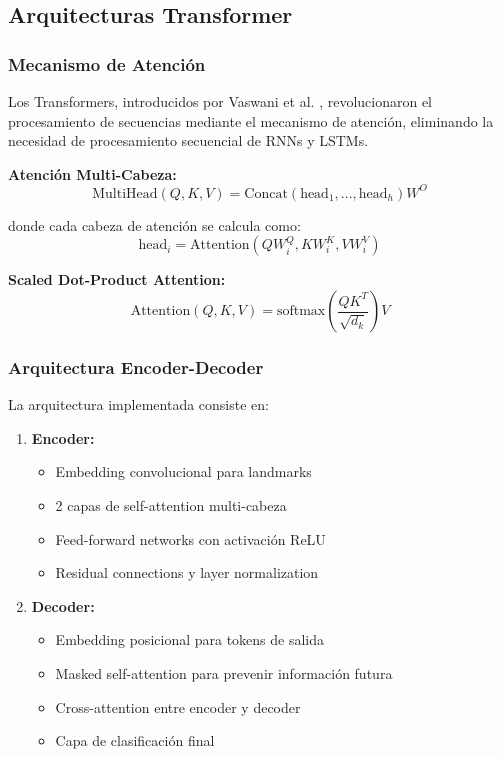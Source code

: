 \documentclass[12pt,a4paper]{article}
\begin{document}
\subsection{Arquitecturas Transformer}

\subsubsection{Mecanismo de Atención}

Los Transformers, introducidos por Vaswani et al. \cite{vaswani2017attention}, revolucionaron el procesamiento de secuencias mediante el mecanismo de atención, eliminando la necesidad de procesamiento secuencial de RNNs y LSTMs.

\textbf{Atención Multi-Cabeza:}
\begin{equation}
\text{MultiHead}(Q, K, V) = \text{Concat}(\text{head}_1, ..., \text{head}_h)W^O
\end{equation}

donde cada cabeza de atención se calcula como:
\begin{equation}
\text{head}_i = \text{Attention}(QW_i^Q, KW_i^K, VW_i^V)
\end{equation}

\textbf{Scaled Dot-Product Attention:}
\begin{equation}
\text{Attention}(Q, K, V) = \text{softmax}\left(\frac{QK^T}{\sqrt{d_k}}\right)V
\end{equation}

\subsubsection{Arquitectura Encoder-Decoder}

La arquitectura implementada consiste en:

\begin{enumerate}
    \item \textbf{Encoder:}
    \begin{itemize}
        \item Embedding convolucional para landmarks
        \item 2 capas de self-attention multi-cabeza
        \item Feed-forward networks con activación ReLU
        \item Residual connections y layer normalization
    \end{itemize}
    
    \item \textbf{Decoder:}
    \begin{itemize}
        \item Embedding posicional para tokens de salida
        \item Masked self-attention para prevenir información futura
        \item Cross-attention entre encoder y decoder
        \item Capa de clasificación final
    \end{itemize}
\end{enumerate}
\end{document}
